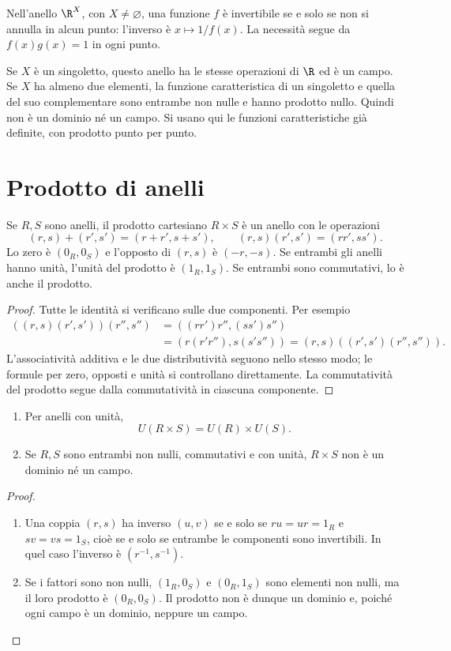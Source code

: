 \begin{esempio}
Nell'anello $\R^X$, con $X\ne\varnothing$, una funzione $f$ è invertibile se e solo se non si annulla in alcun punto: l'inverso è $x\mapsto1/f(x)$. La necessità segue da $f(x)g(x)=1$ in ogni punto.

Se $X$ è un singoletto, questo anello ha le stesse operazioni di $\R$ ed è un campo. Se $X$ ha almeno due elementi, la funzione caratteristica di un singoletto e quella del suo complementare sono entrambe non nulle e hanno prodotto nullo. Quindi non è un dominio né un campo. Si usano qui le funzioni caratteristiche già definite, con prodotto punto per punto.
\end{esempio}

\section{Prodotto di anelli}
\begin{proposizione}
Se $R,S$ sono anelli, il prodotto cartesiano $R\times S$ è un anello con le operazioni
\[
(r,s)+(r',s')=(r+r',s+s'),\qquad
(r,s)(r',s')=(rr',ss').
\]
Lo zero è $(0_R,0_S)$ e l'opposto di $(r,s)$ è $(-r,-s)$. Se entrambi gli anelli hanno unità, l'unità del prodotto è $(1_R,1_S)$. Se entrambi sono commutativi, lo è anche il prodotto.
\end{proposizione}
\begin{proof}
Tutte le identità si verificano sulle due componenti. Per esempio
\[
\begin{aligned}
((r,s)(r',s'))(r'',s'')
 &=((rr')r'',(ss')s'')\\
 &=(r(r'r''),s(s's''))=(r,s)((r',s')(r'',s'')).
\end{aligned}
\]
L'associatività additiva e le due distributività seguono nello stesso modo; le formule per zero, opposti e unità si controllano direttamente. La commutatività del prodotto segue dalla commutatività in ciascuna componente.
\end{proof}

\begin{proposizione}
\begin{enumerate}[label=\arabic*.]
\item Per anelli con unità,
\[
U(R\times S)=U(R)\times U(S).
\]
\item Se $R,S$ sono entrambi non nulli, commutativi e con unità, $R\times S$ non è un dominio né un campo.
\end{enumerate}
\end{proposizione}
\begin{proof}
\begin{enumerate}[label=\arabic*.]
\item Una coppia $(r,s)$ ha inverso $(u,v)$ se e solo se $ru=ur=1_R$ e $sv=vs=1_S$, cioè se e solo se entrambe le componenti sono invertibili. In quel caso l'inverso è $(r^{-1},s^{-1})$.
\item Se i fattori sono non nulli, $(1_R,0_S)$ e $(0_R,1_S)$ sono elementi non nulli, ma il loro prodotto è $(0_R,0_S)$. Il prodotto non è dunque un dominio e, poiché ogni campo è un dominio, neppure un campo.
\end{enumerate}
\end{proof}

